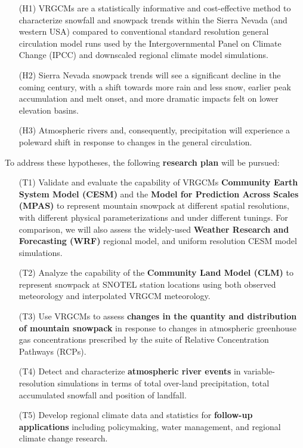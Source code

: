 \documentclass[11pt]{article}
\begin{document}
\vspace{-0.4cm}
\begin{itemize}
\item[(H1)] VRGCMs are a statistically informative and cost-effective method to characterize snowfall and snowpack trends within the Sierra Nevada (and western USA) compared to conventional standard resolution general circulation model runs used by the Intergovernmental Panel on Climate Change (IPCC) and downscaled regional climate model simulations.
\item[(H2)] Sierra Nevada snowpack trends will see a significant decline in the coming century, with a shift towards more rain and less snow, earlier peak accumulation and melt onset, and more dramatic impacts felt on lower elevation basins.
\item[(H3)] Atmospheric rivers and, consequently, precipitation will experience a poleward shift in response to changes in the general circulation.
\end{itemize}

\vspace{-0.4cm}
To address these hypotheses, the following \textbf{research plan} will be pursued:
\begin{itemize}
\item[(T1)] Validate and evaluate the capability of VRGCMs \textbf{Community Earth System Model (CESM)} and the \textbf{Model for Prediction Across Scales (MPAS)} to represent mountain snowpack at different spatial resolutions, with different physical parameterizations and under different tunings.  For comparison, we will also assess the widely-used \textbf{Weather Research and Forecasting (WRF)} regional model, and uniform resolution CESM model simulations.
\item[(T2)] Analyze the capability of the \textbf{Community Land Model (CLM)} to represent snowpack at SNOTEL station locations using both observed meteorology and interpolated VRGCM meteorology.
\item[(T3)] Use VRGCMs to assess \textbf{changes in the quantity and distribution of mountain snowpack} in response to changes in atmospheric greenhouse gas concentrations prescribed by the suite of Relative Concentration Pathways (RCPs).
\item[(T4)] Detect and characterize \textbf{atmospheric river events} in variable-resolution simulations in terms of total over-land precipitation, total accumulated snowfall and position of landfall.
\item[(T5)] Develop regional climate data and statistics for \textbf{follow-up applications} including policymaking, water management, and regional climate change research.
\end{itemize}
\vspace{-0.4cm}
\end{document}
